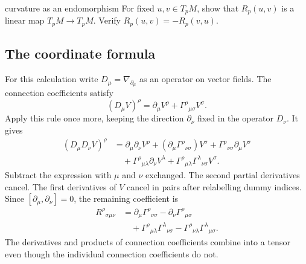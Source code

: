 \documentclass[11pt,a4paper]{article}
\numberwithin{equation}{section}
\begin{document}
\begin{studentwork}[2.5cm]{curvature as an endomorphism}
For fixed \(u,v\in T_pM\), show that \(R_p(u,v)\) is a linear map
\(T_pM\to T_pM\). Verify \(R_p(u,v)=-R_p(v,u)\).
\end{studentwork}

\subsection{The coordinate formula}

For this calculation write \(D_\mu=\nabla_{\partial_\mu}\) as an operator
on vector fields. The connection coefficients satisfy
\[
 (D_\mu V)^\rho
 =\partial_\mu V^\rho+\Gamma^\rho{}_{\mu\sigma}V^\sigma.
\]
Apply this rule once more, keeping the direction \(\partial_\nu\)
fixed in the operator \(D_\nu\). It gives
\begin{align*}
 (D_\mu D_\nu V)^\rho
 &=\partial_\mu\partial_\nu V^\rho
   +(\partial_\mu\Gamma^\rho{}_{\nu\sigma})V^\sigma
   +\Gamma^\rho{}_{\nu\sigma}\partial_\mu V^\sigma\\
 &\quad+\Gamma^\rho{}_{\mu\lambda}\partial_\nu V^\lambda
   +\Gamma^\rho{}_{\mu\lambda}
      \Gamma^\lambda{}_{\nu\sigma}V^\sigma.
\end{align*}
Subtract the expression with \(\mu\) and \(\nu\) exchanged. The second
partial derivatives cancel. The first derivatives of \(V\) cancel in
pairs after relabelling dummy indices. Since
\([\partial_\mu,\partial_\nu]=0\), the remaining coefficient is
\begin{equation}
 \boxed{
 \begin{aligned}
 R^\rho{}_{\sigma\mu\nu}
 &=\partial_\mu\Gamma^\rho{}_{\nu\sigma}
   -\partial_\nu\Gamma^\rho{}_{\mu\sigma}\\
 &\quad+\Gamma^\rho{}_{\mu\lambda}\Gamma^\lambda{}_{\nu\sigma}
   -\Gamma^\rho{}_{\nu\lambda}\Gamma^\lambda{}_{\mu\sigma}.
 \end{aligned}}
 \label{gr2:eq-riemann-coordinate}
\end{equation}
The derivatives and products of connection coefficients combine into a
tensor even though the individual connection coefficients do not.
\end{document}
